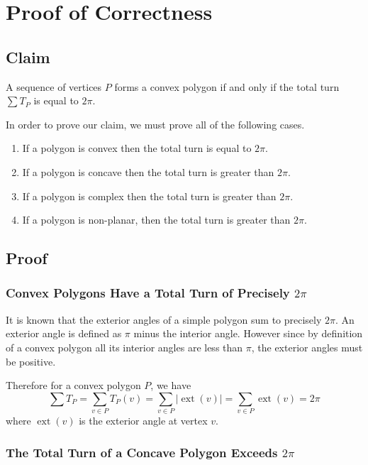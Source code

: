 \documentclass{article}
\newcommand{\exta}{\operatorname{ext}} %
\begin{document}
\section{Proof of Correctness}

\subsection{Claim}

A sequence of vertices \(P\) forms a convex polygon if and only if the total turn \(\sum T_P\) is equal to \(2\pi\).

In order to prove our claim, we must prove all of the following cases.
\begin{enumerate}
	\item If a polygon is convex then the total turn is equal to \(2\pi\).
	\item If a polygon is concave then the total turn is greater than \(2\pi\).
	\item If a polygon is complex then the total turn is greater than \(2\pi\).
	\item If a polygon is non-planar, then the total turn is greater than \(2\pi\).
\end{enumerate}

\subsection{Proof}

\subsubsection{Convex Polygons Have a Total Turn of Precisely \(2\pi\)}

It is known that the exterior angles of a simple polygon sum to precisely \(2\pi\). An exterior angle is defined as \(\pi\) minus the interior angle. However since by definition of a convex polygon all its interior angles are less than \(\pi\), the exterior angles must be positive.

Therefore for a convex polygon \(P\), we have
\begin{equation*}
	\sum T_P = \sum_{v \in P} T_P(v) = \sum_{v \in P} | \exta(v) | = \sum_{v \in P} \exta (v) = 2\pi
\end{equation*}
where \(\exta (v)\) is the exterior angle at vertex \(v\).

\subsubsection{The Total Turn of a Concave Polygon Exceeds \(2\pi\)}
\end{document}
